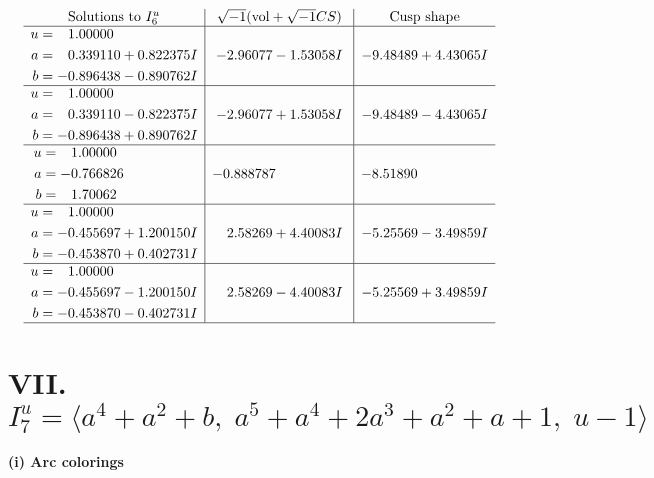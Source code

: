 \documentclass[1p]{elsarticle_modified}
\theoremstyle{definition}
\newcommand{\I}{\sqrt{-1}}
\begin{document}
$$\begin{array}{c|c|c}  
\text{Solutions to }I^u_{6}& \I (\text{vol} + \sqrt{-1}CS) & \text{Cusp shape}\\
 \hline 
\begin{aligned}
u &= \phantom{-}1.00000\phantom{ +0.000000I} \\
a &= \phantom{-}0.339110 + 0.822375 I \\
b &= -0.896438 - 0.890762 I\end{aligned}
 & -2.96077 - 1.53058 I & -9.48489 + 4.43065 I \\ \hline\begin{aligned}
u &= \phantom{-}1.00000\phantom{ +0.000000I} \\
a &= \phantom{-}0.339110 - 0.822375 I \\
b &= -0.896438 + 0.890762 I\end{aligned}
 & -2.96077 + 1.53058 I & -9.48489 - 4.43065 I \\ \hline\begin{aligned}
u &= \phantom{-}1.00000\phantom{ +0.000000I} \\
a &= -0.766826\phantom{ +0.000000I} \\
b &= \phantom{-}1.70062\phantom{ +0.000000I}\end{aligned}
 & -0.888787\phantom{ +0.000000I} & -8.51890\phantom{ +0.000000I} \\ \hline\begin{aligned}
u &= \phantom{-}1.00000\phantom{ +0.000000I} \\
a &= -0.455697 + 1.200150 I \\
b &= -0.453870 + 0.402731 I\end{aligned}
 & \phantom{-}2.58269 + 4.40083 I & -5.25569 - 3.49859 I \\ \hline\begin{aligned}
u &= \phantom{-}1.00000\phantom{ +0.000000I} \\
a &= -0.455697 - 1.200150 I \\
b &= -0.453870 - 0.402731 I\end{aligned}
 & \phantom{-}2.58269 - 4.40083 I & -5.25569 + 3.49859 I\\
 \hline 
 \end{array}$$\newpage\newpage\renewcommand{\arraystretch}{1}
\centering \section*{VII. $I^u_{7}= \langle a^4+a^2+b,\;a^5+a^4+2 a^3+a^2+a+1,\;u-1 \rangle$}
\flushleft \textbf{(i) Arc colorings}\\
\end{document}
